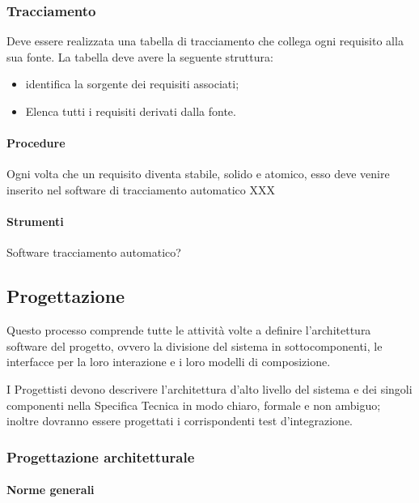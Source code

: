 \subsubsection{Tracciamento}

Deve essere realizzata una tabella di tracciamento che collega ogni requisito alla sua fonte.
La tabella deve avere la seguente struttura:

\begin{itemize}
\item {} identifica la sorgente dei requisiti associati;
\item {} Elenca tutti i requisiti derivati dalla fonte.
\end{itemize}


\paragraph{Procedure}
Ogni volta che un requisito diventa stabile, solido e atomico, esso deve venire inserito nel software di tracciamento automatico XXX


\paragraph{Strumenti}
Software tracciamento automatico?



\subsection{Progettazione}
Questo processo comprende tutte le attività volte a definire l'architettura software del progetto, ovvero la divisione del sistema in sottocomponenti, le interfacce per la loro interazione e i loro modelli di composizione. %


I Progettisti devono descrivere l'architettura d'alto livello del sistema e dei singoli componenti nella Specifica Tecnica in modo chiaro, formale e non ambiguo; inoltre dovranno essere progettati i corrispondenti test d'integrazione.



\subsubsection{Progettazione architetturale}
\label{prog_arch}
\paragraph{Norme generali}



